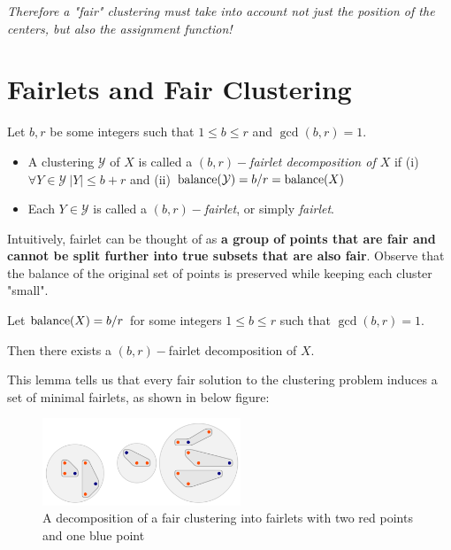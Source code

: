 {\it Therefore a "fair" clustering must take into account not just the position of the centers, but also the assignment function!}



\section{Fairlets and Fair Clustering}

\begin{definition}
Let $b, r$ be some integers such that $1 \leq b \leq r$ and $\gcd(b, r) = 1$.

\begin{itemize}
	\item A clustering $\mathcal{Y}$ of $X$ is called a {\it $(b, r)-$fairlet decomposition of $X$} if
	(i) $\forall Y \in \mathcal{Y} \ |Y| \leq b + r$ and (ii) $\operatorname{balance}(\mathcal{Y}) = b/r = \operatorname{balance}(X)$
	
	\item Each $Y \in \mathcal{Y}$ is called a {\it $(b, r)-$fairlet}, or simply {\it fairlet}.

\end{itemize}
\end{definition}

Intuitively, fairlet can be thought of as {\bf a group of points that are fair and cannot be split further into true subsets that are also fair}. Observe that the balance of the original set of points is preserved while keeping each cluster "small".

\begin{lemma}
Let $\operatorname{balance}(X) = b/r$ for some integers $1 \leq b \leq r$ such that $\gcd(b, r) = 1$.

\noindent Then there exists a $(b, r)-$fairlet decomposition of $X$.
\end{lemma}

This lemma tells us that every fair solution to the clustering problem induces a set of minimal fairlets, as shown in below figure:

\begin{figure}[hbt]
	\centering
	\includegraphics[height=2.6cm]{preliminaries/fig/fig2.png}
	\caption{A decomposition of a fair clustering into fairlets with two red points and one blue point}
\end{figure}

